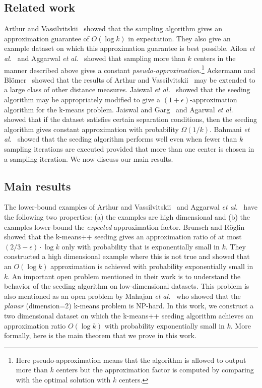 \documentclass[11pt]{article}
\newcommand{\etal}{{\it et al.}}
\begin{document}
\subsection{Related work} 
Arthur and Vassilvitskii~\cite{ArthurV07} showed that the sampling algorithm gives an approximation guarantee of $O(\log{k})$ in expectation. They also give an example dataset on which this approximation guarantee is best possible. Ailon \etal~\cite{AJMonteleoni09} and Aggarwal \etal~\cite{AggarwalDK09} showed that sampling more than $k$ centers in the manner described above gives a constant {\em pseudo-approximation}.\footnote{Here pseudo-approximation means that the algorithm is allowed to output more than $k$ centers but the approximation factor is computed by comparing with the optimal solution with $k$ centers.}
Ackermann and Bl\"{o}mer~\cite{ab10} showed that the results of Arthur and Vassilvitskii~\cite{ArthurV07} may be extended to a large class of other distance measures. 
Jaiswal \etal~\cite{jks12} showed that the seeding algorithm may be appropriately modified to give a $(1 + \epsilon)$-approximation algorithm for the k-means problem. 
Jaiswal and Garg~\cite{jg12} and Agarwal \etal~\cite{ajp13} showed that if the dataset satisfies certain separation conditions, then the seeding algorithm gives constant approximation with probability $\Omega(1/k)$. 
Bahmani \etal~\cite{b12} showed that the seeding algorithm performs well even when fewer than $k$ sampling iterations are executed provided that more than one center is chosen in a sampling iteration.
We now discuss our main results.

\subsection{Main results}
The lower-bound examples of Arthur and Vassilvitskii~\cite{ArthurV07} and Aggarwal \etal~\cite{AggarwalDK09} have the following two properties: (a) the examples are high dimensional and (b) the examples lower-bound the {\em expected} approximation factor. 
Brunsch and R\"{o}glin~\cite{br12} showed that the k-means++ seeding gives  
an approximation ratio of at most $(2/3 - \epsilon)\cdot \log{k}$ only with probability that is exponentially small in $k$.
They constructed a high dimensional example where this is not true and showed that an $O(\log{k})$ approximation is achieved with probability exponentially small in $k$.
An important open problem mentioned in their work is to understand the behavior of the seeding algorithm on low-dimensional datasets. 
This problem is also mentioned as an open problem by Mahajan \etal~\cite{mnv12} who showed that the {\em planar} (dimension=2) k-means problem is NP-hard.
In this work, we construct a two dimensional dataset on which the k-means++ seeding algorithm achieves an approximation ratio $O(\log{k})$ with probability exponentially small in $k$. 
More formally, here is the main theorem that we prove in this work.
\end{document}
